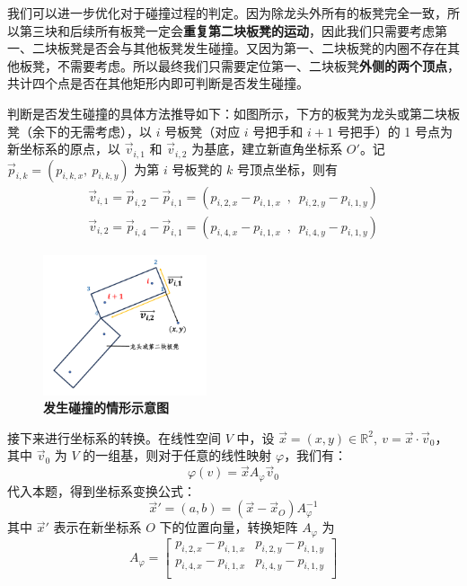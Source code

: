 \documentclass[zihao=-4, UTF8]{article}		%
\def\R{\mathbb{R}}
\theoremstyle{MyLineTheoremStyle} %
\theoremstyle{MyBlockTheoremStyle} %
\theoremstyle{MySubsubsectionStyle} %
\begin{document}
我们可以进一步优化对于碰撞过程的判定。因为除龙头外所有的板凳完全一致，所以第三块和后续所有板凳一定会\textbf{重复第二块板凳的运动}，因此我们只需要考虑第一、二块板凳是否会与其他板凳发生碰撞。又因为第一、二块板凳的内圈不存在其他板凳，不需要考虑。所以最终我们只需要定位第一、二块板凳\textbf{外侧的两个顶点}，共计四个点是否在其他矩形内即可判断是否发生碰撞。

判断是否发生碰撞的具体方法推导如下：如图所示，下方的板凳为龙头或第二块板凳（余下的无需考虑），以 $i$ 号板凳（对应 $i$ 号把手和 $i+1$ 号把手）的 1 号点为新坐标系的原点，以 $\vec{v}_{i,1}$ 和 $\vec{v}_{i,2}$ 为基底，建立新直角坐标系 $O'$。记 $\vec{p}_{i,k} = ({p}_{i,k,x},\ {p}_{i,k,y})$ 为第 $i$ 号板凳的 $k$ 号顶点坐标，则有 
\begin{gather}
    \vec{v}_{i,1}=\vec{p}_{i,2}-\vec{p}_{i,1}=(p_{i,2,x}-p_{i,1,x}\enspace,\enspace p_{i,2,y}-p_{i,1,y})\\
    \vec{v}_{i,2}=\vec{p}_{i,4}-\vec{p}_{i,1}=(p_{i,4,x}-p_{i,1,x}\enspace ,\enspace p_{i,4,y}-p_{i,1,y})
\end{gather}
\begin{figure}[H]
    \centering
    \includegraphics[width=0.43\textwidth]{assets/t2crush.pdf}
    \caption{\textbf{发生碰撞的情形示意图}}
    \label{发生碰撞的情形示意图}
\end{figure}

接下来进行坐标系的转换。在线性空间 $V$ 中，设 $\vec{x} = (x, y) \in \R^2,\ v = \vec{x}\cdot\vec{v}_0$，其中 $\vec{v}_0$ 为 $V$ 的一组基，则对于任意的线性映射 $\varphi$，我们有：
\begin{equation}
\varphi(v) = \vec{x}A_\varphi\vec{v}_0
\end{equation}
代入本题，得到坐标系变换公式：
\begin{equation}
\vec{x}'= (a,b) = (\vec{x} - \vec{x}_O)A_\varphi^{-1}
\end{equation}
其中 $\vec{x}'$ 表示在新坐标系 $O$ 下的位置向量，转换矩阵 $A_\varphi$ 为
\begin{equation}
A_\varphi =     
\begin{bmatrix} 
    p_{i,2,x}-p_{i,1,x} & p_{i,2,y}-p_{i,1,y}\\ 
    p_{i,4,x}-p_{i,1,x} & p_{i,4,y}-p_{i,1,y}\\ 
\end{bmatrix}
\end{equation}
\end{document}
